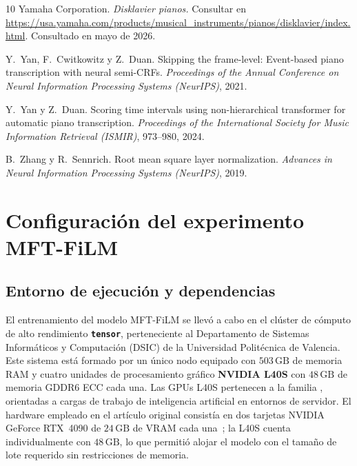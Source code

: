 \documentclass[11pt,spanish,listoffigures,listoftables]{tfgetsinf}
\begin{document}
\begin{thebibliography}{10}
Yamaha Corporation.
\newblock \emph{Disklavier pianos.}
\newblock Consultar en
\url{https://usa.yamaha.com/products/musical_instruments/pianos/disklavier/index.html}.
\newblock Consultado en mayo de 2026.

Y.~Yan, F.~Cwitkowitz y Z.~Duan.
\newblock Skipping the frame-level: Event-based piano transcription with neural semi-{CRFs}.
\newblock \textit{Proceedings of the Annual Conference on Neural Information Processing Systems (NeurIPS)}, 2021.

Y.~Yan y Z.~Duan.
\newblock Scoring time intervals using non-hierarchical transformer for automatic piano transcription.
\newblock \textit{Proceedings of the International Society for Music Information Retrieval (ISMIR)}, 973--980, 2024.

B.~Zhang y R.~Sennrich.
\newblock Root mean square layer normalization.
\newblock \textit{Advances in Neural Information Processing Systems (NeurIPS)}, 2019.

\end{thebibliography}

\cleardoublepage


\APPENDIX

\chapter{Configuración del experimento MFT-FiLM}
\label{anx:mft_config}

\section{Entorno de ejecución y dependencias}

El entrenamiento del modelo MFT-FiLM se llevó a cabo en el clúster de cómputo
de alto rendimiento \texttt{\textbf{tensor}}, perteneciente al Departamento de Sistemas
Informáticos y Computación (DSIC) de la Universidad Politécnica de Valencia.
Este sistema está formado por un único nodo equipado con $503\,\text{GB}$
de memoria RAM y cuatro unidades de procesamiento gráfico \textbf{NVIDIA L40S}
con $48\,\text{GB}$ de memoria GDDR6 ECC cada una. Las GPUs L40S pertenecen a
la familia , orientadas a cargas de trabajo de
inteligencia artificial en entornos de servidor. El hardware empleado en el
artículo original consistía en dos tarjetas NVIDIA GeForce RTX~4090 de
$24\,\text{GB}$ de VRAM cada una~\cite{wang2025mftfilm}; la L40S cuenta
individualmente con $48\,\text{GB}$, lo que permitió alojar el modelo con el
tamaño de lote requerido sin restricciones de memoria.
\end{document}
